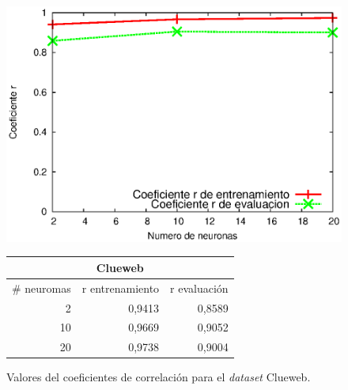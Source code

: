 \begin{figure}[tp]
  \begin{minipage}[][][b]{0.5\linewidth}
    \centering
    \includegraphics[width=\linewidth]{images/cluewebRN.eps}
  \end{minipage}%
  \begin{minipage}[b]{0.30\linewidth}
    		\centering
		\begin{tabular}{|r|r|r|}
		\hline
		\multicolumn{ 3}{|c|}{Clueweb} \\ \hline
		\multicolumn{1}{|l|}{\# neuromas} & \multicolumn{1}{l|}{r entrenamiento} & \multicolumn{1}{l|}{r evaluación} \\ \hline
		2 & 0,9413 & 0,8589 \\ \hline
		10 & 0,9669 & 0,9052 \\ \hline
		20 & 0,9738 & 0,9004 \\ \hline
		\end{tabular}
   \end{minipage}
\caption{Valores del coeficientes de correlación para el \textit{dataset} Clueweb.}
\label{fig:cluewebRN}
\end{figure}


